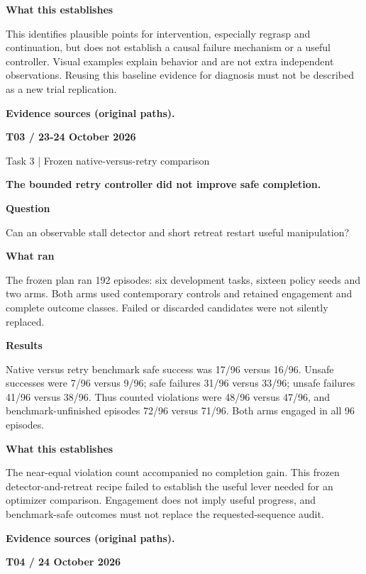 \documentclass[11pt,a4paper]{article}
\newcommand{\block}[2]{\par\textbf{\color{ink}#1}\par\nopagebreak #2\par}
\newcommand{\finding}[1]{\begin{tcolorbox}[colback=pale,colframe=pale,boxrule=0pt,arc=1mm,left=10pt,right=10pt,top=10pt,bottom=10pt]\color{ink}\large\bfseries #1\end{tcolorbox}}
\begin{document}
\block{What this establishes}{This identifies plausible points for intervention, especially regrasp and continuation, but does not establish a causal failure mechanism or a useful controller. Visual examples explain behavior and are not extra independent observations. Reusing this baseline evidence for diagnosis must not be described as a new trial replication.}
\vfill{\footnotesize\color{muted}\textbf{Evidence sources (original paths).}\par
\raggedright {}\par {}\par {}}
\clearpage
{}\label{exp:T03}
{\color{accent}\small\bfseries T03 / 23-24 October 2026}\par
{}\par
{\color{muted}\small Task 3 | Frozen native-versus-retry comparison}\par\vspace{2mm}
\finding{The bounded retry controller did not improve safe completion.}
\block{Question}{Can an observable stall detector and short retreat restart useful manipulation?}
\block{What ran}{The frozen plan ran 192 episodes: six development tasks, sixteen policy seeds and two arms. Both arms used contemporary controls and retained engagement and complete outcome classes. Failed or discarded candidates were not silently replaced.}
\block{Results}{Native versus retry benchmark safe success was 17/96 versus 16/96. Unsafe successes were 7/96 versus 9/96; safe failures 31/96 versus 33/96; unsafe failures 41/96 versus 38/96. Thus counted violations were 48/96 versus 47/96, and benchmark-unfinished episodes 72/96 versus 71/96. Both arms engaged in all 96 episodes.}
\block{What this establishes}{The near-equal violation count accompanied no completion gain. This frozen detector-and-retreat recipe failed to establish the useful lever needed for an optimizer comparison. Engagement does not imply useful progress, and benchmark-safe outcomes must not replace the requested-sequence audit.}
\vfill{\footnotesize\color{muted}\textbf{Evidence sources (original paths).}\par
\raggedright {}\par {}}
\clearpage
{}\label{exp:T04}
{\color{accent}\small\bfseries T04 / 24 October 2026}\par
\end{document}
